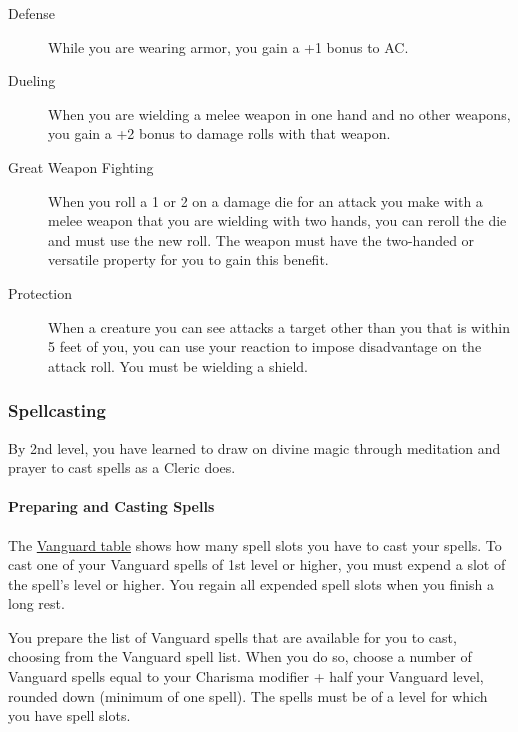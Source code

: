 \begin{description}
\item[Defense]
While you are wearing armor, you gain a +1 bonus to AC.
\end{description}

\begin{description}
\item[Dueling]
When you are wielding a melee weapon in one hand and no other weapons,
you gain a +2 bonus to damage rolls with that weapon.
\end{description}

\begin{description}
\item[Great Weapon Fighting]
When you roll a 1 or 2 on a damage die for an attack you make with a
melee weapon that you are wielding with two hands, you can reroll the
die and must use the new roll. The weapon must have the two-handed or
versatile property for you to gain this benefit.
\end{description}

\begin{description}
\item[Protection]
When a creature you can see attacks a target other than you that is
within 5 feet of you, you can use your reaction to impose disadvantage
on the attack roll. You must be wielding a shield.
\end{description}

\subsubsection{Spellcasting}\label{vanguard-feature-spellcasting}

By 2nd level, you have learned to draw on divine magic through
meditation and prayer to cast spells as a Cleric does.

\paragraph{Preparing and Casting
Spells}\label{_preparing_and_casting_spells}

The \hyperref[vanguard-table]{Vanguard table} shows how many spell slots
you have to cast your spells. To cast one of your Vanguard spells of 1st
level or higher, you must expend a slot of the spell's level or higher.
You regain all expended spell slots when you finish a long rest.

You prepare the list of Vanguard spells that are available for you to
cast, choosing from the Vanguard spell list. When you do so, choose a
number of Vanguard spells equal to your Charisma modifier + half your
Vanguard level, rounded down (minimum of one spell). The spells must be
of a level for which you have spell slots.

